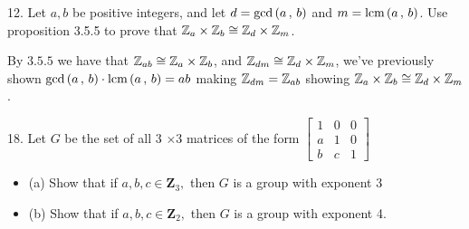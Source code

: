 \newpage
\begin{mdframed}[style=darkQuesion]
12. Let $a,b$ be positive integers, and let $d=\text{gcd}\left(a\,,\,b\right)$ and $m=\text{lcm}\left(a\,,\,b\right)$. 
Use proposition 3.5.5 to prove that $\mathbb{Z}_a\times \mathbb{Z}_b\cong \mathbb{Z}_d\times \mathbb{Z}_m$.
\end{mdframed}
\begin{mdframed}[style=darkAnswer,frametitle={Joe Starr}]
 By $3.5.5$ we have that $\mathbb{Z}_{ab}\cong \mathbb{Z}_a\times \mathbb{Z}_b$, and 
 $\mathbb{Z}_{dm}\cong \mathbb{Z}_d\times \mathbb{Z}_m$, we've previously shown $\text{gcd}\left(a\,,\,b\right)\cdot \text{lcm}\left(a\,,\,b\right)=ab$
 making $\mathbb{Z}_{dm}=\mathbb{Z}_{ab}$ showing $\mathbb{Z}_a\times \mathbb{Z}_b\cong \mathbb{Z}_d\times \mathbb{Z}_m$.
\end{mdframed}
\newpage
\begin{mdframed}[style=darkQuesion]
18. Let $G$ be the set of all 3 $\times 3$ matrices of the form $\left[\begin{array}{lll}1 & 0 & 0 \\ a & 1 & 0 \\ b & c & 1\end{array}\right]$
  \begin{itemize}
    \item []{(a) Show that if $a, b, c \in \mathbf{Z}_{3},$ then $G$ is a group with exponent 3}
    \item []{(b) Show that if $a, b, c \in \mathbf{Z}_{2},$ then $G$ is a group with exponent 4.}
  \end{itemize}
  
  
\end{mdframed}
